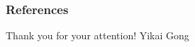 \begin{frame}[plain]
    \tiny
    \frametitle{References}
    
    
\end{frame}

\begin{frame}[plain]
    \begin{center}
        \Huge Thank you for your attention!
        \vfill
        \Large Yikai Gong
    \end{center}
\end{frame}

